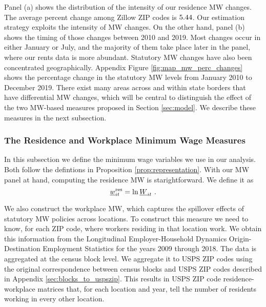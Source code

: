 Panel (a) shows the distribution of the intensity of our residence MW changes. 
The average percent change among Zillow ZIP codes is $\textnormal{5.44}$.
Our estimation strategy exploits the intensity of MW changes.
On the other hand, panel (b) shows the timing of those changes between 2010 and 
2019.
Most changes occur in either January or July, and the majority of them take 
place later in the panel, where our rents data is more abundant.
Statutory MW changes have also been concentrated geographically.
Appendix Figure \ref{fig:map_mw_perc_changes} shows the percentage change 
in the statutory MW levels from January 2010 to December 2019.
There exist many areas across and within state borders that have differential 
MW changes,
which will be central to distinguish the effect of the two MW-based measures
proposed in Section \ref{sec:model}.
We describe these measures in the next subsection. 

\subsubsection*{The Residence and Workplace Minimum Wage Measures}

In this subsection we define the minimum wage variables we use in our analysis.
Both follow the defintions in Proposition \ref{prop:representation}.
With our MW panel at hand, computing the residence MW is starightforward.
We define it as
\begin{equation*}
    \underline{w}^{\text{res}}_{it} = \ln \underline{W}_{it} \ .
\end{equation*}

We also construct the workplace MW, which captures the spillover effects of
statutory MW policies across locations.
To construct this measure we need to know, for each ZIP code, where workers 
residing in that location work.
We obtain this information from the Longitudinal Employer-Household 
Dynamics Origin-Destination Employment Statistics \parencite[LODES;][]{CensusLODES}
for the years 2009 through 2018.
The data is aggregated at the census block level.
We aggregate it to USPS ZIP codes using the original correspondence between 
census blocks and USPS ZIP codes described in Appendix 
\ref{sec:blocks_to_uspszip}.
This results in USPS ZIP code residence-workplace matrices that, for each 
location and year, tell the number of residents working in every other 
location.

